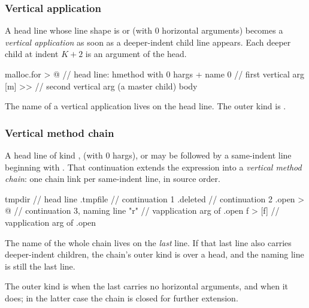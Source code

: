 \subsubsection{Vertical application}\label{sec:syntax:vapp}

A head line whose line shape is  or  (with 0 horizontal
  arguments) becomes a \emph{vertical application} as soon as a deeper-indent
  child line appears.
Each deeper child at indent \(K+2\) is an argument of the head.

\begin{ffcode}
malloc.for > @           // head line: hmethod with 0 hargs + name
  0                      //   first vertical arg
  [m] >>                 //   second vertical arg (a master child)
    body
\end{ffcode}

The name of a vertical application lives on the head line.
The outer kind is .

\subsubsection{Vertical method chain}\label{sec:syntax:vmethod}

A head line of kind ,  (with 0 hargs), or
   may be followed by a same-indent line beginning
  with .
That continuation extends the expression into a \emph{vertical method chain}:
  one chain link per same-indent  line, in source order.

\begin{ffcode}
tmpdir                   // head line
.tmpfile                 //   continuation 1
.deleted                 //   continuation 2
.open > @                //   continuation 3, naming line
  "r"                    //   vapplication arg of .open
  f > [f]                //   vapplication arg of .open
\end{ffcode}

The name of the whole chain lives on the \emph{last}  line.
If that last  line also carries deeper-indent children,
  the chain's outer kind is  over a  head,
  and the naming line is still the last  line.

The outer kind is  when the last  carries no
  horizontal arguments, and  when it does;
  in the latter case the chain is closed for further extension.

